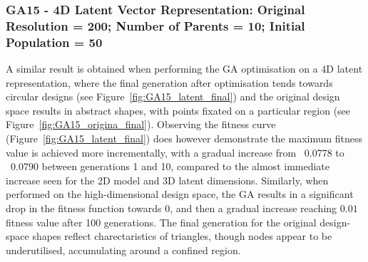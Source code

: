 \documentclass{article}
\begin{document}
\subsubsection*{GA15 - 4D Latent Vector Representation: Original Resolution = 200; Number of Parents = 10; Initial Population = 50}

A similar result is obtained when performing the GA optimisation on a 4D latent representation, where the final generation after optimisation tends towards circular designs (see Figure~\ref{fig:GA15_latent_final}) and the original design space results in abstract shapes, with points fixated on a particular region (see Figure~\ref{fig:GA15_origina_final}).
Observing the fitness curve (Figure~\ref{fig:GA15_latent_final}) does however demonstrate the maximum fitness value is achieved more incrementally, with a gradual increase from ~0.0778 to ~0.0790 between generations 1 and 10, compared to the almost immediate increase seen for the 2D model and 3D latent dimensions. Similarly, when performed on the high-dimensional design space, the GA results in a significant drop in the fitness function towards 0, and then a gradual increase reaching $0.01$ fitness value after 100 generations. The final generation for the original design-space shapes reflect charectaristics of triangles, though nodes appear to be underutilised, accumulating around a confined region.
\end{document}
